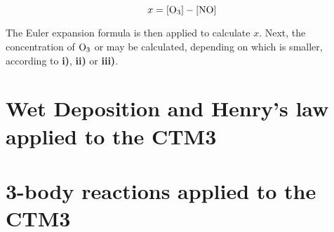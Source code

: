 \begin{equation}
    x = [\mathrm{O_3}] - [\mathrm{NO}]
\end{equation}

The Euler expansion formula is then applied to calculate $x$. Next, the concentration of $\mathrm{O_3}$ or  may be calculated, depending on which is smaller, according to \textbf{i)}, \textbf{ii)} or \textbf{iii)}. 

\section{Wet Deposition and Henry's law applied to the CTM3}

\section{3-body reactions applied to the CTM3}

